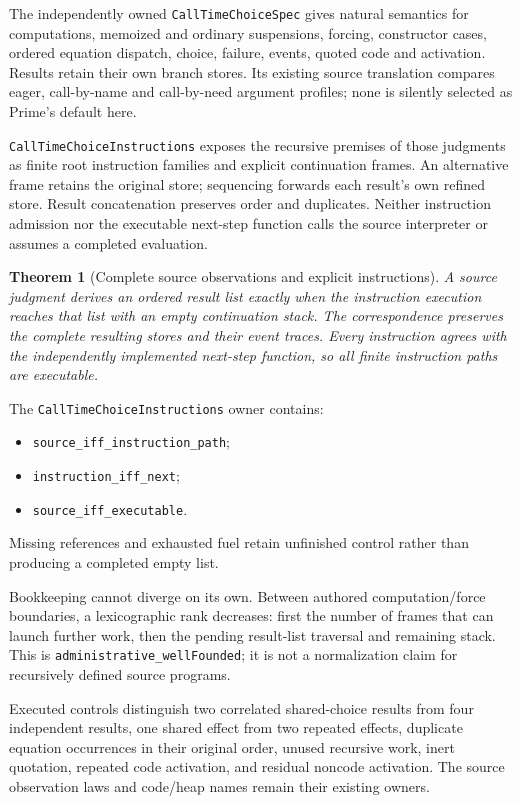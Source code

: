 \documentclass[11pt]{article}
\newtheorem{theorem}{Theorem}
\newcommand{\code}[1]{\texttt{\small #1}}
\begin{document}
The independently owned \code{CallTimeChoiceSpec} gives natural semantics
for computations, memoized and ordinary suspensions, forcing, constructor
cases, ordered equation dispatch, choice, failure, events, quoted code and
activation. Results retain their own branch stores. Its existing source
translation compares eager, call-by-name and call-by-need argument profiles;
none is silently selected as Prime's default here.

\code{CallTimeChoiceInstructions} exposes the recursive premises of those
judgments as finite root instruction families and explicit continuation
frames. An alternative frame retains the original store; sequencing forwards
each result's own refined store. Result concatenation preserves order and
duplicates. Neither instruction admission nor the executable next-step
function calls the source interpreter or assumes a completed evaluation.

\begin{theorem}[Complete source observations and explicit instructions]
A source judgment derives an ordered result list exactly when the
instruction execution reaches that list with an empty continuation stack.
The correspondence preserves the complete resulting stores and their event
traces. Every instruction agrees with the independently implemented
next-step function, so all finite instruction paths are executable.
\end{theorem}
The \code{CallTimeChoiceInstructions} owner contains:
\begin{itemize}
\item \code{source\_iff\_instruction\_path};
\item \code{instruction\_iff\_next};
\item \code{source\_iff\_executable}.
\end{itemize}
Missing references and exhausted fuel
retain unfinished control rather than producing a completed empty list.

Bookkeeping cannot diverge on its own. Between authored computation/force
boundaries, a lexicographic rank decreases: first the number of frames that
can launch further work, then the pending result-list traversal and remaining
stack. This is \code{administrative\_wellFounded}; it is not a normalization
claim for recursively defined source programs.

Executed controls distinguish two correlated shared-choice results from
four independent results, one shared effect from two repeated effects,
duplicate equation occurrences in their original order, unused recursive
work, inert quotation, repeated code activation, and residual noncode
activation. The source observation laws and code/heap names remain their
existing owners.
\end{document}
